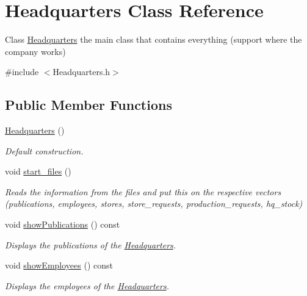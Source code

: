 \hypertarget{class_headquarters}{}\section{Headquarters Class Reference}
\label{class_headquarters}


Class \hyperlink{class_headquarters}{Headquarters} the main class that contains everything (support where the company works)  




{\ttfamily \#include $<$Headquarters.\+h$>$}

\subsection*{Public Member Functions}
\begin{DoxyCompactItemize}
\item 
\mbox{\label{class_headquarters_a47ada4046d4b5feaadc63d64439420ab}} 
\hyperlink{class_headquarters_a47ada4046d4b5feaadc63d64439420ab}{Headquarters} ()
\begin{DoxyCompactList}\small\item\em Default construction. \end{DoxyCompactList}\item 
void \hyperlink{class_headquarters_a55cc9c6aa484bb13d2612baa90098183}{start\+\_\+files} ()
\begin{DoxyCompactList}\small\item\em Reads the information from the files and put this on the respective vectors (publications, employees, stores, store\+\_\+requests, production\+\_\+requests, hq\+\_\+stock) \end{DoxyCompactList}\item 
void \hyperlink{class_headquarters_aabdb893a0704f29221d48d6f1bb61bd6}{show\+Publications} () const
\begin{DoxyCompactList}\small\item\em Displays the publications of the \hyperlink{class_headquarters}{Headquarters}. \end{DoxyCompactList}\item 
void \hyperlink{class_headquarters_a3dacd649a7dce9de39328bf45fdd79d8}{show\+Employees} () const
\begin{DoxyCompactList}\small\item\em Displays the employees of the \hyperlink{class_headquarters}{Headquarters}. \end{DoxyCompactList}\item 

\end{DoxyCompactItemize}

